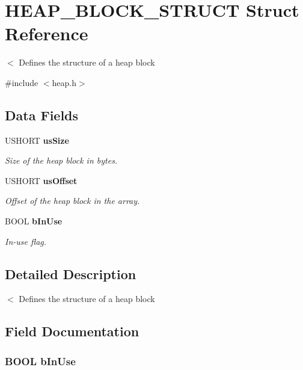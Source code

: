 \section{HEAP\_\-BLOCK\_\-STRUCT Struct Reference}
\label{struct_h_e_a_p___b_l_o_c_k___s_t_r_u_c_t}


$<$ Defines the structure of a heap block  


{\ttfamily \#include $<$heap.h$>$}\subsection*{Data Fields}
\begin{DoxyCompactItemize}
\item 
USHORT {\bf usSize}
\begin{DoxyCompactList}\small\item\em Size of the heap block in bytes. \item\end{DoxyCompactList}\item 
USHORT {\bf usOffset}
\begin{DoxyCompactList}\small\item\em Offset of the heap block in the array. \item\end{DoxyCompactList}\item 
BOOL {\bf bInUse}
\begin{DoxyCompactList}\small\item\em In-\/use flag. \item\end{DoxyCompactList}\end{DoxyCompactItemize}


\subsection{Detailed Description}
$<$ Defines the structure of a heap block 

\subsection{Field Documentation}
\subsubsection[{bInUse}]{\setlength{\rightskip}{0pt plus 5cm}BOOL {\bf bInUse}}\label{struct_h_e_a_p___b_l_o_c_k___s_t_r_u_c_t_aea6d1ac949d280da0302e9de4fe6c5ab}


